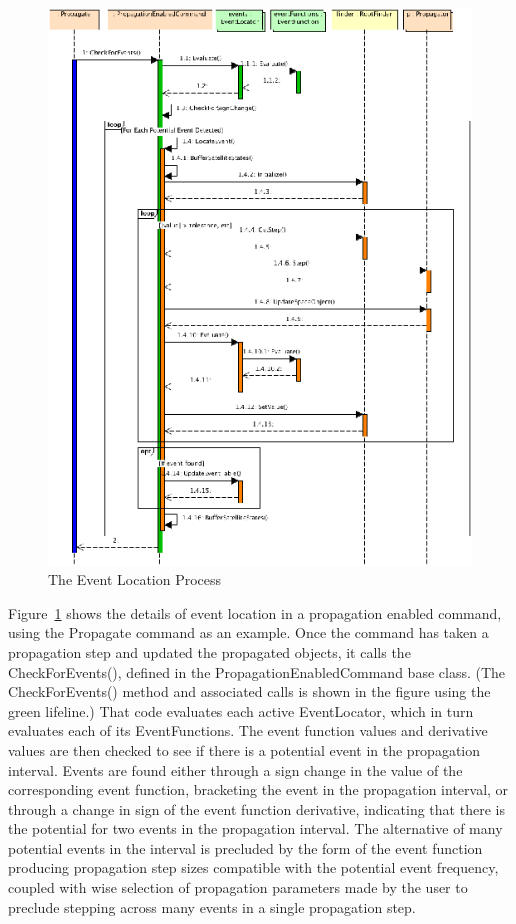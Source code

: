 \documentclass[letterpaper,10pt]{article}
\begin{document}
\begin{figure}[htb]
\begin{center}
\includegraphics[scale=1.6]{./Images/ProcessEvents.eps}
\caption{\label{fig:ProcessEvents}The Event Location Process}
\end{center}
\end{figure} 

Figure~\ref{fig:ProcessEvents} shows the details of event location in a
propagation enabled command, using the Propagate command as an example.  Once
the command has taken a propagation step and updated the propagated objects, it
calls the CheckForEvents(), defined in the PropagationEnabledCommand base
class.  (The CheckForEvents() method and associated calls is shown in the figure
using the green lifeline.) That code evaluates each active EventLocator, which
in turn evaluates each of its EventFunctions. The event function values and
derivative values are then checked to see if there is a potential event in the
propagation interval. Events are found either through a sign change in the value
of the corresponding event function, bracketing the event in the propagation
interval, or through a change in sign of the event function derivative,
indicating that there is the potential for two events in the propagation
interval.  The alternative of many potential events in the interval is precluded
by the form of the event function producing propagation step sizes compatible
with the potential event frequency, coupled with wise selection of propagation
parameters made by the user to preclude stepping across many events in a single
propagation step.
\end{document}
